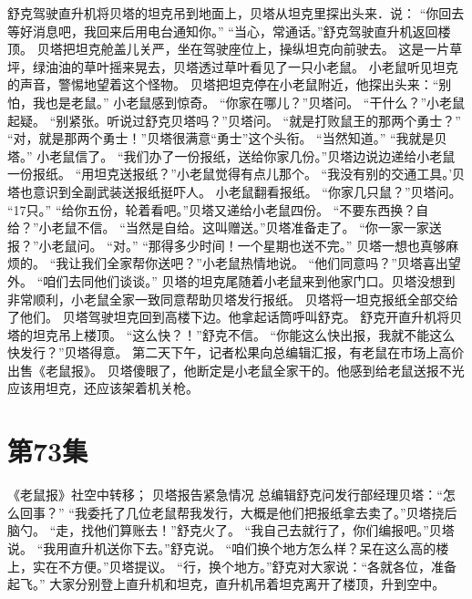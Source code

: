 \documentclass[a4paper,12pt,UTF8,twoside]{ctexbook}
\begin{document}
        舒克驾驶直升机将贝塔的坦克吊到地面上，贝塔从坦克里探出头来．说： 
        “你回去等好消息吧，我回来后用电台通知你。” 
        “当心，常通话。”舒克驾驶直升机返回楼顶。 
        贝塔把坦克舱盖儿关严，坐在驾驶座位上，操纵坦克向前驶去。 
        这是一片草坪，绿油油的草叶摇来晃去，贝塔透过草叶看见了一只小老鼠。 
        小老鼠听见坦克的声音，警惕地望着这个怪物。 
        贝塔把坦克停在小老鼠附近，他探出头来：“别怕，我也是老鼠。” 
        小老鼠感到惊奇。 
        “你家在哪儿？”贝塔问。 
        “干什么？”小老鼠起疑。 
        “别紧张。听说过舒克贝塔吗？”贝塔问。 
        “就是打败鼠王的那两个勇士？” 
        “对，就是那两个勇士！”贝塔很满意“勇士”这个头衔。 
        “当然知道。” 
        “我就是贝塔。” 
        小老鼠信了。 
        “我们办了一份报纸，送给你家几份。”贝塔边说边递给小老鼠一份报纸。 
        “用坦克送报纸？”小老鼠觉得有点儿那个。 
        “我没有别的交通工具。’贝塔也意识到全副武装送报纸挺吓人。 
        小老鼠翻看报纸。 
        “你家几只鼠？”贝塔问。 
        “17只。” 
        “给你五份，轮着看吧。”贝塔又递给小老鼠四份。 
        “不要东西换？自给？”小老鼠不信。 
        “当然是自给。这叫赠送。”贝塔准备走了。 
        “你一家一家送报？”小老鼠问。 
        “对。” 
        “那得多少时间！一个星期也送不完。” 
        贝塔一想也真够麻烦的。 
        “我让我们全家帮你送吧？”小老鼠热情地说。 
        “他们同意吗？”贝塔喜出望外。 
        “咱们去同他们谈谈。” 
        贝塔的坦克尾随着小老鼠来到他家门口。贝塔没想到非常顺利，小老鼠全家一致同意帮助贝塔发行报纸。 
        贝塔将一坦克报纸全部交给了他们。 
        贝塔驾驶坦克回到高楼下边。他拿起话筒呼叫舒克。 
        舒克开直升机将贝塔的坦克吊上楼顶。 
        “这么快？！”舒克不信。 
        “你能这么快出报，我就不能这么快发行？”贝塔得意。 
        第二天下午，记者松果向总编辑汇报，有老鼠在市场上高价出售《老鼠报》。 
        贝塔傻眼了，他断定是小老鼠全家干的。他感到给老鼠送报不光应该用坦克，还应该架着机关枪。   \chapter{第73集} 
        《老鼠报》社空中转移； 
        贝塔报告紧急情况   
        总编辑舒克问发行部经理贝塔：“怎么回事？” 
        “我委托了几位老鼠帮我发行，大概是他们把报纸拿去卖了。”贝塔挠后脑勺。 
        “走，找他们算账去！”舒克火了。 
        “我自己去就行了，你们编报吧。”贝塔说。 
        “我用直升机送你下去。”舒克说。 
        “咱们换个地方怎么样？呆在这么高的楼上，实在不方便。”贝塔提议。 
        “行，换个地方。”舒克对大家说：“各就各位，准备起飞。” 
        大家分别登上直升机和坦克，直升机吊着坦克离开了楼顶，升到空中。 
\end{document}
